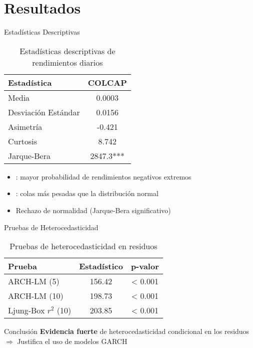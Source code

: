 \section{Resultados}

\begin{frame}{Estadísticas Descriptivas}
    \begin{table}
        \centering
        \begin{tabular}{lc}
            \toprule
            \textbf{Estadística} & \textbf{COLCAP} \\
            \midrule
            Media & 0.0003 \\
            Desviación Estándar & 0.0156 \\
            Asimetría & -0.421 \\
            Curtosis & 8.742 \\
            Jarque-Bera & 2847.3*** \\
            \bottomrule
        \end{tabular}
        \caption{Estadísticas descriptivas de rendimientos diarios}
    \end{table}
    
    \vspace{0.5em}
    
    \begin{itemize}
        \item<2-> : mayor probabilidad de rendimientos negativos extremos
        \item<3-> : colas más pesadas que la distribución normal
        \item<4-> Rechazo de normalidad (Jarque-Bera significativo)
    \end{itemize}
\end{frame}

\begin{frame}{Pruebas de Heterocedasticidad}
    \begin{table}
        \centering
        \begin{tabular}{lcc}
            \toprule
            \textbf{Prueba} & \textbf{Estadístico} & \textbf{p-valor} \\
            \midrule
            ARCH-LM (5) & 156.42 & < 0.001 \\
            ARCH-LM (10) & 198.73 & < 0.001 \\
            Ljung-Box $r^2$ (10) & 203.85 & < 0.001 \\
            \bottomrule
        \end{tabular}
        \caption{Pruebas de heterocedasticidad en residuos}
    \end{table}
    
    \vspace{1em}
    
    \begin{alertblock}{Conclusión}
        \textbf{Evidencia fuerte} de heterocedasticidad condicional en los residuos
        $\Rightarrow$ Justifica el uso de modelos GARCH
    \end{alertblock}
\end{frame}

